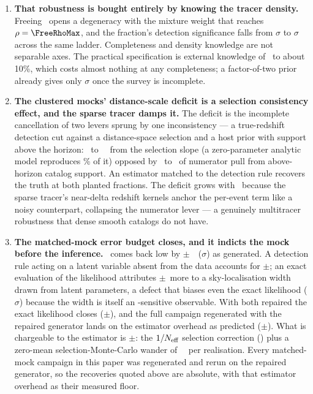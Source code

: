 \begin{enumerate}
\item \textbf{That robustness is bought entirely by knowing the tracer density.}
Freeing \nzagn\ opens a degeneracy with the mixture weight that reaches
$\rho = \FreeRhoMax$, and the fraction's detection significance falls from
\FreeCompleteExactSig$\sigma$ to \FreeMeighteenFreeSig$\sigma$ across the same
ladder. Completeness and density knowledge are not separable axes. The practical
specification is external knowledge of \nzagn\ to about 10\%, which costs almost
nothing at any completeness; a factor-of-two prior already gives only
\FreeMeighteenFtwoSig$\sigma$ once the survey is incomplete.

\item \textbf{The clustered mocks' distance-scale deficit is a selection
consistency effect, and the sparse tracer damps it.} The deficit is the
incomplete cancellation of two levers sprung by one inconsistency --- a
true-redshift detection cut against a distance-space selection and a host
prior with support above the horizon: \BaseDecompShiftThree\ to
\BaseDecompShiftSeven~\kmsmpc\ from the selection slope (a zero-parameter
analytic model reproduces \TiltModelPct\% of it) opposed by
\TiltNumLeakThree\ to \TiltNumLeakSeven\ of numerator pull from
above-horizon catalog support. An estimator matched to the detection rule
recovers the truth at both planted fractions. The deficit grows with \fagn\
because the sparse tracer's near-delta redshift kernels anchor the per-event
term like a noisy counterpart, collapsing the numerator lever --- a genuinely
multitracer robustness that dense smooth catalogs do not have.

\item \textbf{The matched-mock error budget closes, and it indicts the mock
before the inference.} \Hz\ comes back low by
\AbCtrlMeanAbs$\pm$\AbCtrlSem~\kmsmpc\ (\AbCtrlSig$\sigma$) as generated. A
detection rule acting on a latent variable absent from the data accounts for
\AbDiffMean$\pm$\AbDiffSem; an exact evaluation of the likelihood attributes
\OrcExactOff$\pm$\OrcExactSem\ more to a sky-localisation width drawn from
latent parameters, a defect that biases even the exact likelihood
(\OrcExactSig$\sigma$) because the width is itself an \Hz-sensitive
observable. With both repaired the exact likelihood closes
(\OrcBootFixOff$\pm$\OrcBootFixSem), and the full campaign regenerated with
the repaired generator lands on the estimator overhead as predicted
(\CloFixMean$\pm$\CloFixSem). What is chargeable to the estimator is
\OrcPairedOff$\pm$\OrcPairedSem: the $1/N_{\rm eff}$ selection correction
(\OrcFarr) plus a zero-mean selection-Monte-Carlo wander of
\OrcMuNoiseSd~\kmsmpc\ per realisation. Every matched-mock campaign in this
paper was regenerated and rerun on the repaired generator, so the recoveries
quoted above are absolute, with that estimator overhead as their measured
floor.


\end{enumerate}
